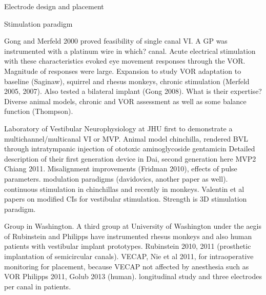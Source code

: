 Electrode design and placement


Stimulation paradigm


Gong and Merfeld 2000 proved feasibility of single canal VI. A GP was instrumented with a platinum wire in which? canal. Acute electrical stimulation with these characteristics  evoked eye movement responses through the VOR. Magnitude of responses were large. Expansion to study VOR adaptation to baseline (Saginaw), squirrel and rhesus monkeys, chronic stimulation (Merfeld 2005, 2007). Also tested a bilateral implant (Gong 2008). What is their expertise? Diverse animal models, chronic and VOR assessment as well as some balance function (Thompson).

Laboratory of Vestibular Neurophysiology at JHU first to demonstrate a multichannel/multicanal VI or MVP. Animal model chinchilla, rendered BVL through intratympanic injection of ototoxic aminoglycoside gentamicin Detailed description of their first generation device in Dai, second generation here MVP2 Chiang 2011. Misalignment improvements (Fridman 2010), effects of pulse parameters. modulation paradigms (davidovics, another paper as well). continuous stimulation in chinchillas and recently in monkeys. Valentin et al papers on modified CIs for vestibular stimulation. Strength is 3D stimulation paradigm.

Group in Washington. A third group at University of Washington under the aegis of Rubinstein and Philipps have instrumented rhesus monkeys and also human patients with vestibular implant prototypes. Rubinstein 2010, 2011 (prosthetic implantation of semicircular canals). VECAP, Nie et al 2011, for intraoperative monitoring for placement, because VECAP not affected by anesthesia such as VOR Philipps 2011, Golub 2013 (human). longitudinal study and three electrodes per canal in patients.